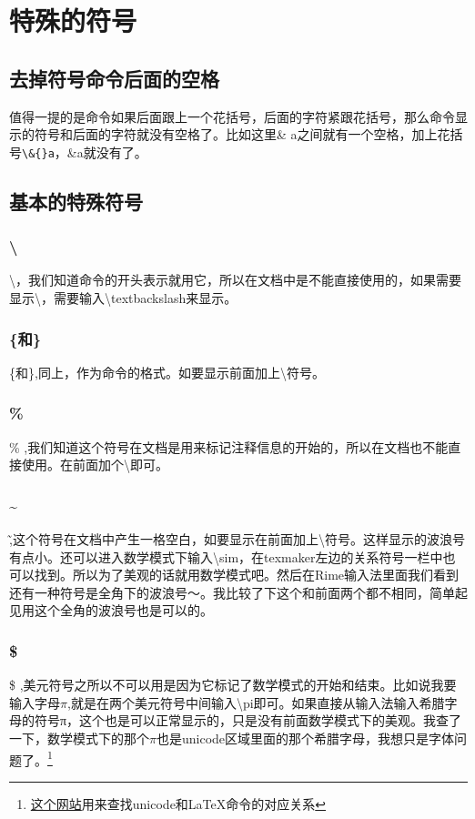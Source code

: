 \documentclass[11pt,oneside]{book}
\begin{document}
  \chapter{特殊的符号}
  \label{sec:symbols}
  \section{去掉符号命令后面的空格}
  值得一提的是命令如果后面跟上一个花括号，后面的字符紧跟花括号，那么命令显示的符号和后面的字符就没有空格了。比如这里\& a之间就有一个空格，加上花括号\verb+\&{}a+，\&{}a就没有了。

  \section{基本的特殊符号}
  \subsection{\textbackslash}
  \textbackslash ，我们知道命令的开头表示就用它，所以在文档中是不能直接使用的，如果需要显示\textbackslash ，需要输入\textbackslash textbackslash来显示。

  \subsection{\{和\}}
  \{和\},同上，作为命令的格式。如要显示前面加上\textbackslash 符号。

  \subsection{\%}
  \% ,我们知道这个符号在文档是用来标记注释信息的开始的，所以在文档也不能直接使用。在前面加个\textbackslash 即可。

  \subsection{\~{}}
  \~ ,这个符号在文档中产生一格空白，如要显示在前面加上\textbackslash 符号。这样显示的波浪号有点小。还可以进入数学模式下输入\textbackslash sim，在texmaker左边的关系符号一栏中也可以找到。所以为了美观的话就用数学模式吧。然后在Rime输入法里面我们看到还有一种符号是全角下的波浪号～。我比较了下这个和前面两个都不相同，简单起见用这个全角的波浪号也是可以的。

  \subsection{\$}
  \$ ,美元符号之所以不可以用是因为它标记了数学模式的开始和结束。比如说我要输入字母$\pi$,就是在两个美元符号中间输入\textbackslash pi即可。如果直接从输入法输入希腊字母的符号π，这个也是可以正常显示的，只是没有前面数学模式下的美观。我查了一下，数学模式下的那个$\pi$也是unicode区域里面的那个希腊字母，我想只是字体问题了。\footnote{\href{http://www.johndcook.com/unicode_latex.html}{这个网站}用来查找unicode和\LaTeX 命令的对应关系}
\end{document}
